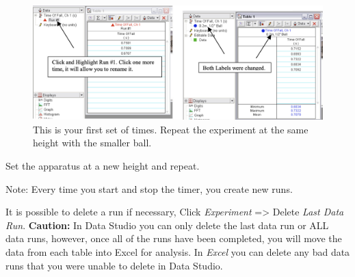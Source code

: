 \begin{figure}[ht]
  \centerline{\includegraphics[scale=0.6]{resources/photo8.jpg}}
  \caption{This is your first set of times. Repeat the experiment at the same height with the smaller ball.}
  \label{3.5}
\end{figure}

Set the apparatus at a new height and repeat.

Note: Every time you start and stop the timer, you create new runs.

It is possible to delete a run if necessary, Click \emph{Experiment} => Delete \emph{Last 
Data Run}. \textbf{Caution:} In Data Studio you can only delete the last data run or ALL 
data runs, however, once all of the runs have been completed, you will move the 
data from each table into Excel for analysis. In \emph{Excel} you can delete any bad data 
runs that you were unable to delete in Data Studio.
